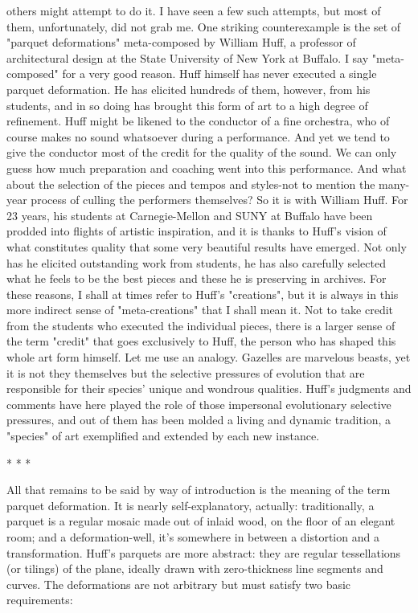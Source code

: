 others might attempt to do it. I have seen a few such attempts, but most of them,
unfortunately, did not grab me. One striking counterexample is the set of "parquet
deformations" meta-composed by William Huff, a professor of architectural design at the
State University of New York at Buffalo.
        I say "meta-composed" for a very good reason. Huff himself has never executed a
single parquet deformation. He has elicited hundreds of them, however, from his
students, and in so doing has brought this form of art to a high degree of refinement. Huff
might be likened to the conductor of a fine orchestra, who of course makes no sound
whatsoever during a performance. And yet we tend to give the conductor most of the
credit for the quality of the sound. We can only guess how much preparation and
coaching went into this performance. And what about the selection of the pieces and
tempos and styles-not to mention the many-year process of culling the performers
themselves?
        So it is with William Huff. For 23 years, his students at Carnegie-Mellon and
SUNY at Buffalo have been prodded into flights of artistic inspiration, and it is thanks to
Huff's vision of what constitutes quality that some very beautiful results have emerged.
Not only has he elicited outstanding work from students, he has also carefully selected
what he feels to be the best pieces and these he is preserving in archives. For these
reasons, I shall at times refer to Huff's "creations", but it is always in this more indirect
sense of "meta-creations" that I shall mean it.
        Not to take credit from the students who executed the individual pieces, there is a
larger sense of the term "credit" that goes exclusively to Huff, the person who has shaped
this whole art form himself. Let me use an analogy. Gazelles are marvelous beasts, yet it
is not they themselves but the selective pressures of evolution that are responsible for
their species' unique and wondrous qualities. Huff's judgments and comments have here
played the role of those impersonal evolutionary selective pressures, and out of them has
been molded a living and dynamic tradition, a "species" of art exemplified and extended
by each new instance.

                                         *   *   *

       All that remains to be said by way of introduction is the meaning of the term
parquet deformation. It is nearly self-explanatory, actually: traditionally, a parquet is a
regular mosaic made out of inlaid wood, on the floor of an elegant room; and a
deformation-well, it's somewhere in between a distortion and a transformation. Huff's
parquets are more abstract: they are regular tessellations (or tilings) of the plane, ideally
drawn with zero-thickness line segments and curves. The deformations are not arbitrary
but must satisfy two basic requirements:

